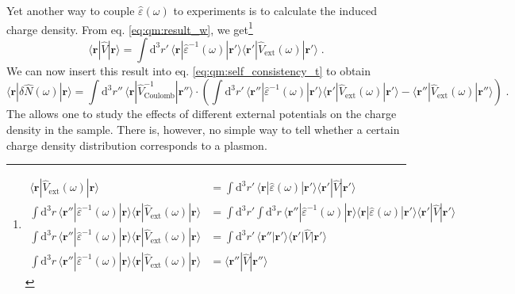 \documentclass[a4paper,12pt]{article}
\begin{document}
    Yet another way to couple $\hat\varepsilon(\omega)$ to experiments is to calculate the induced charge density. From eq. \eqref{eq:qm:result_w}, we get\footnote{ %
        \begin{equation*}
        \begin{aligned}
            \langle\mathbf{r} |\hat V_\text{ext}(\omega)| \mathbf{r}\rangle &= \int\!\!\text{d}^3r'\, \langle\mathbf{r} |\hat\varepsilon(\omega)| \mathbf{r'}\rangle\langle\mathbf{r'} |\hat V|\mathbf{r'}\rangle \\
            \int\!\!\text{d}^3r\,\langle\mathbf{r''}|\hat\varepsilon^{-1}(\omega)|\mathbf{r}\rangle\langle\mathbf{r} |\hat V_\text{ext}(\omega)| \mathbf{r}\rangle &= \int\!\!\text{d}^3r'\!\!\!\int\!\!\text{d}^3r\,\langle\mathbf{r''} |\hat\varepsilon^{-1}(\omega) |\mathbf{r}\rangle\langle\mathbf{r} |\hat\varepsilon(\omega)| \mathbf{r'}\rangle\langle\mathbf{r'} |\hat V| \mathbf{r'}\rangle \\
            \int\!\!\text{d}^3r\,\langle\mathbf{r''} |\hat\varepsilon^{-1}(\omega)| \mathbf{r}\rangle \langle\mathbf{r} |\hat V_\text{ext}(\omega)| \mathbf{r}\rangle &= \int\!\!\text{d}^3r'\,\langle\mathbf{r''} | \mathbf{r'}\rangle \langle\mathbf{r'} |\hat V| \mathbf{r'}\rangle \\
            \int\!\!\text{d}^3r\,\langle\mathbf{r''} |\hat\varepsilon^{-1}(\omega)| \mathbf{r}\rangle \langle\mathbf{r} |\hat V_\text{ext}(\omega)| \mathbf{r}\rangle &= \langle\mathbf{r''} |\hat V| \mathbf{r''}\rangle
        \end{aligned}
        \end{equation*}
    }
    \begin{equation*}
        \langle\mathbf{r} |\hat V| \mathbf{r}\rangle = \int\!\!\text{d}^3r'\,\langle\mathbf{r} |\hat\varepsilon^{-1}(\omega)| \mathbf{r'}\rangle \langle\mathbf{r'} |\hat V_\text{ext}(\omega)| \mathbf{r'}\rangle\; .
    \end{equation*}
    We can now insert this result into eq. \eqref{eq:qm:self_consistency_t} to obtain
    \begin{equation} \label{eq:exp:charge_density}
        \langle\mathbf{r} |\delta\hat N(\omega)| \mathbf{r}\rangle = \int\!\!\text{d}^3r''\, \langle\mathbf{r} |\hat V^{-1}_\text{Coulomb}| \mathbf{r''}\rangle \cdot \left( \int\!\!\text{d}^3r'\, \langle\mathbf{r''} |\hat\varepsilon^{-1}(\omega)| \mathbf{r'}\rangle\langle\mathbf{r'} |\hat V_\text{ext}(\omega)| \mathbf{r'}\rangle - \langle\mathbf{r''} |\hat V_\text{ext}(\omega)| \mathbf{r''}\rangle \!\right) \; .
    \end{equation}
    The allows one to study the effects of different external potentials on the charge density in the sample. There is, however, no simple way to tell whether a certain charge density distribution corresponds to a plasmon.
\end{document}
